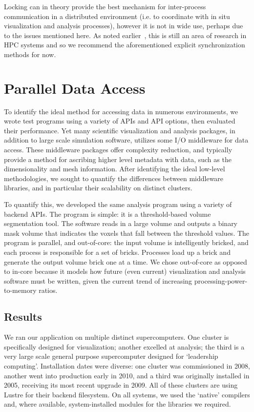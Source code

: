 Locking can in theory provide the best mechanism for inter-process
communication in a distributed environment (i.e. to coordinate with in
situ visualization and analysis processes), however it is not in wide
use, perhaps due to the issues mentioned here.  As noted
earlier~\cite{Ching:2007:Locking}, this is still an area of research
in HPC systems and so we recommend the aforementioned explicit
synchronization methods for now.

\section{Parallel Data Access}\label{sec:access}

To identify the ideal method for accessing data in numerous
environments, we wrote test programs using a variety of APIs and
API options, then evaluated their performance.  Yet many scientific
visualization and analysis packages, in addition to large scale
simulation software, utilizes some I/O middleware for data access.
These middleware packages offer complexity reduction, and typically
provide a method for ascribing higher level metadata with data, such as
the dimensionality and mesh information.  After identifying the ideal
low-level methodologies, we sought to quantify the differences between
middleware libraries, and in particular their scalability on distinct
clusters.

To quantify this, we developed the same analysis program using
a variety of backend APIs.  The program is simple: it is a
threshold-based volume segmentation tool.  The software reads in a
large volume and outputs a binary mask volume that indicates the
voxels that fall between the threshold values.  The program is
parallel, and out-of-core: the input volume is intelligently bricked,
and each process is responsible for a set of bricks.  Processes load up
a brick and generate the output volume brick one at a time.  We chose
out-of-core as opposed to in-core because it models how future (even
current) visualization and analysis software must be written, given the
current trend of increasing processing-power-to-memory ratios.


\subsection{Results}

We ran our application on multiple distinct supercomputers.  One
cluster is specifically designed for visualization; another excelled at
analysis; the third is a very large scale general purpose supercomputer
designed for `leadership computing'.  Installation dates were diverse:
one cluster was commissioned in 2008, another went into production
early in 2010, and a third was originally installed in 2005, receiving
its most recent upgrade in 2009.  All of these clusters are using
Lustre for their backend filesystem.  On all systems, we used the
`native' compilers and, where available, system-installed modules for
the libraries we required.


